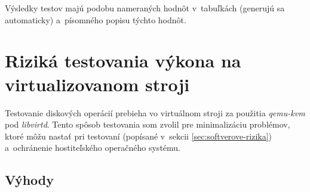 Výsledky testov majú podobu nameraných hodnôt v~tabuľkách (generujú sa
automaticky) a~písomného popisu týchto hodnôt.


%
%

\section{Riziká testovania výkona na virtualizovanom stroji}
\label{sec:virtual-machine}

Testovanie diskových operácií prebieha vo virtuálnom stroji za použitia
\emph{qemu-kvm} pod \emph{libvirtd}. Tento spôsob testovania som zvolil pre
minimalizáciu problémov, ktoré môžu nastať pri testovaní (popísané v~sekcii
\ref{sec:softverove-rizika}) a~ochránenie hostiteľského operačného systému.

\subsection{Výhody}

